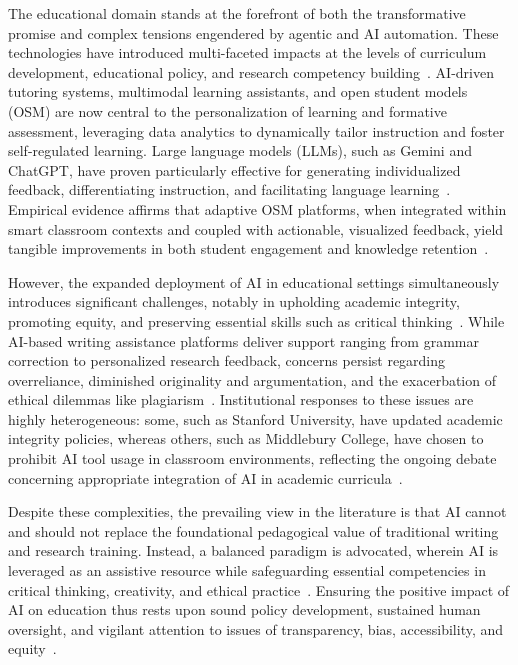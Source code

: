 \documentclass[sigconf]{acmart}
\begin{document}
The educational domain stands at the forefront of both the transformative promise and complex tensions engendered by agentic and AI automation. These technologies have introduced multi-faceted impacts at the levels of curriculum development, educational policy, and research competency building~\cite{ref109,ref110,ref111,ref112,ref113,ref114,ref115}. AI-driven tutoring systems, multimodal learning assistants, and open student models (OSM) are now central to the personalization of learning and formative assessment, leveraging data analytics to dynamically tailor instruction and foster self-regulated learning. Large language models (LLMs), such as Gemini and ChatGPT, have proven particularly effective for generating individualized feedback, differentiating instruction, and facilitating language learning~\cite{ref109,ref110,ref111}. Empirical evidence affirms that adaptive OSM platforms, when integrated within smart classroom contexts and coupled with actionable, visualized feedback, yield tangible improvements in both student engagement and knowledge retention~\cite{ref110,ref111}.

However, the expanded deployment of AI in educational settings simultaneously introduces significant challenges, notably in upholding academic integrity, promoting equity, and preserving essential skills such as critical thinking~\cite{ref109,ref110,ref112,ref113,ref114,ref115}. While AI-based writing assistance platforms deliver support ranging from grammar correction to personalized research feedback, concerns persist regarding overreliance, diminished originality and argumentation, and the exacerbation of ethical dilemmas like plagiarism~\cite{ref109,ref110,ref112,ref113,ref114,ref115}. Institutional responses to these issues are highly heterogeneous: some, such as Stanford University, have updated academic integrity policies, whereas others, such as Middlebury College, have chosen to prohibit AI tool usage in classroom environments, reflecting the ongoing debate concerning appropriate integration of AI in academic curricula~\cite{ref109,ref110,ref113,ref114,ref115}.

Despite these complexities, the prevailing view in the literature is that AI cannot and should not replace the foundational pedagogical value of traditional writing and research training. Instead, a balanced paradigm is advocated, wherein AI is leveraged as an assistive resource while safeguarding essential competencies in critical thinking, creativity, and ethical practice~\cite{ref109,ref110,ref113,ref114,ref115}. Ensuring the positive impact of AI on education thus rests upon sound policy development, sustained human oversight, and vigilant attention to issues of transparency, bias, accessibility, and equity~\cite{ref110,ref111,ref113,ref114,ref115}.
\end{document}
